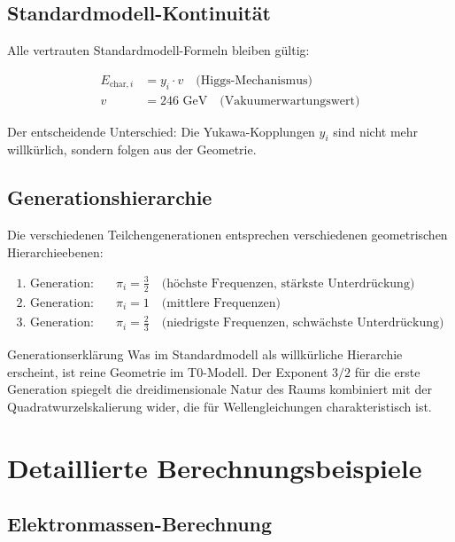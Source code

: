 \documentclass[12pt,a4paper]{article}
\begin{document}
	\subsection{Standardmodell-Kontinuität}
	\label{subsec:standard_model_continuity}
	
	Alle vertrauten Standardmodell-Formeln bleiben gültig:
	
	\begin{align}
		E_{\text{char},i} &= y_i \cdot v \quad \text{(Higgs-Mechanismus)} \\
		v &= 246 \text{ GeV} \quad \text{(Vakuumerwartungswert)}
	\end{align}
	
	Der entscheidende Unterschied: Die Yukawa-Kopplungen $y_i$ sind nicht mehr willkürlich, sondern folgen aus der Geometrie.
	
	\subsection{Generationshierarchie}
	\label{subsec:generation_hierarchy}
	
	Die verschiedenen Teilchengenerationen entsprechen verschiedenen geometrischen Hierarchieebenen:
	
	\begin{align}
		\text{1. Generation:} \quad &\pi_i = \frac{3}{2} \quad \text{(höchste Frequenzen, stärkste Unterdrückung)} \\
		\text{2. Generation:} \quad &\pi_i = 1 \quad \text{(mittlere Frequenzen)} \\
		\text{3. Generation:} \quad &\pi_i = \frac{2}{3} \quad \text{(niedrigste Frequenzen, schwächste Unterdrückung)}
	\end{align}
	
	\begin{important}{Generationserklärung}{}
		Was im Standardmodell als willkürliche Hierarchie erscheint, ist reine Geometrie im T0-Modell. Der Exponent $3/2$ für die erste Generation spiegelt die dreidimensionale Natur des Raums kombiniert mit der Quadratwurzelskalierung wider, die für Wellengleichungen charakteristisch ist.
	\end{important}
	
	\section{Detaillierte Berechnungsbeispiele}
	\label{sec:calculation_examples}
	
	\subsection{Elektronmassen-Berechnung}
	\label{subsec:electron_calculation}
	
\end{document}
